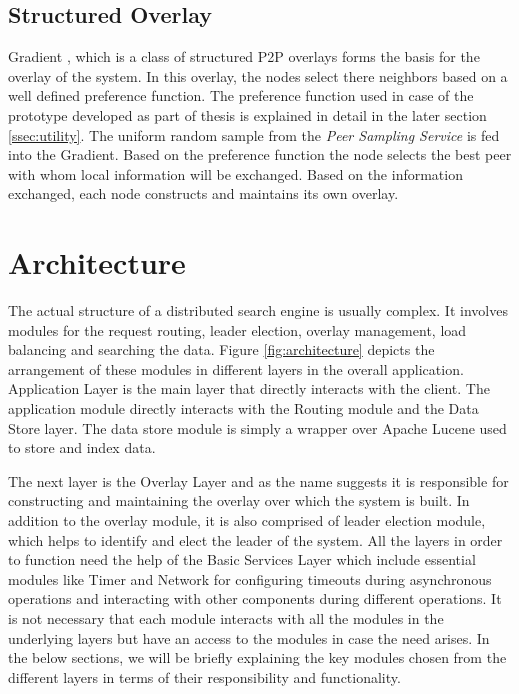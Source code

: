 \documentclass[12pt,a4paper,twoside,openright]{book}
\begin{document}
\subsection{Structured Overlay}

Gradient \cite{sacha2006discovery}, which is a class of structured P2P overlays forms the basis for the overlay of the system. In this overlay, the nodes select there neighbors based on a well defined preference function. The preference function used in case of the prototype developed as part of thesis is explained in detail in the later section \ref{ssec:utility}. The uniform random sample from the \textit{Peer Sampling Service} is fed into the Gradient. Based on the preference function the node selects the best peer with whom local information will be exchanged. Based on the information exchanged, each node constructs and maintains its own overlay.


\section{Architecture}
\label{sec:architecture}

The actual structure of a distributed search engine is usually complex. It involves modules for the request routing, leader election, overlay management, load balancing and searching the data. Figure \ref{fig:architecture} depicts the arrangement of these modules in different layers in the overall application. Application Layer is the main layer that directly interacts with the client. The application module directly interacts with the Routing module and the Data Store layer. The data store module is simply a wrapper over Apache Lucene used to store and index data.

\par The next layer is the Overlay Layer and as the name suggests it is responsible for constructing and maintaining the overlay over which the system is built. In addition to the overlay module, it is also comprised of leader election module, which helps to identify and elect the leader of the system. All the layers in order to function need the help of the Basic Services Layer which include essential modules like Timer and Network for configuring timeouts during asynchronous operations and interacting with other components during different operations. It is not necessary that each module interacts with all the modules in the underlying layers but have an access to the modules in case the need arises. In the below sections, we will be briefly explaining the key modules chosen from the different layers in terms of their responsibility and functionality.
\end{document}
